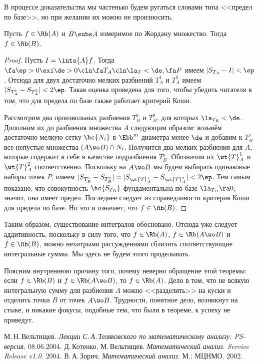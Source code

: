 \documentclass[a4paper]{article}
\begin{document}
В процессе доказательства мы частенько будем ругаться словами типа <<предел по базе>>, но при
желании их можно не произносить.

\begin{theorem}
Пусть $f \in \Rb(A)$ и $B \subs A$ измеримое по Жордану множество.
Тогда $f \in \Rb(B)$.
\end{theorem}
\begin{proof}
Пусть $I = \ints{A} f$. Тогда $\fa \ep > 0 \exi \de > 0\cln \fa T_A\cln \la_T < \de, \fa P$
имеем $|S_{T_A} - I| < \ep$. Отсюда для двух достаточно мелких разбиений $T_A^1$ и $T_A^2$
имеем $|S_{T_A^1} - S_{T_A^2}| < 2\ep$. Такая оценка проведена для того, чтобы убедить читателя
в том, что для предела по базе также работает критерий Коши.

Рассмотрим два произвольных разбиения $T_B^1$ и $T_B^2$, для которых $\la_{T_B} <\de$. Дополним их
до разбиения множества $A$ следующим образом: возьмём достаточно мелкую сетку $\hc{N_i}$ в $\Ebb^m$
диаметра менее $\de$ и добавим к $T_B^j$ все непустые множества $(A \wo B) \cap N_i$. Получится два
мелких разбиения для $A$, которые содержит в себе в качестве подразбиения $T_B^j$. Обозначим их $\wt{T}^1_A$
и $\wt{T}_A^2$ соответственно. Поскольку на $A \wo B$ мы будем выбирать одинаковые наборы точек $P$,
имеем $|S_{T_B^1} - S_{T_B^2}| = |S_{\wt{T}_A^1} - S_{\wt{T}_A^2}| < 2\ep$. Тем самым показано,
что совокупность $\hc{S_{T_B}}$ фундаментальна по базе $\la_{T_B} \ra 0$, значит, она имеет предел.
Последнее следует из справедливости критерия Коши для предела по базе.
Но это и означает, что $f \in \Rb(B)$.
\end{proof}

Таким образом, существование интегралов обосновано. Отсюда уже следует аддитивность,
поскольку в силу того, что $f \in \Rb(A)$, $f \in \Rb(A \wo B)$ и $f \in \Rb(B)$, можно
нехитрыми рассуждениями сблизить соответствующие интегральные суммы. Мы здесь не будем
этого проделывать.

Поясним внутреннюю причину того, почему неверно обращение этой теоремы: если $f \in \Rb(B)$ и $f \in \Rb(A \wo B)$,
то $f \in \Rb(A)$. Дело в том, что не всякую интегральную сумму для разбиения $A$ можно <<разделить>>
на куски и отделить точки $B$ от точек $A \wo B$. Трудности, понятное дело,
возникнут на стыке, и никакие фокусы, подобные тем, что были в теореме, к успеху не приведут.


\begin{thebibliography}{[1]}
 М.\,Н.\,Вельтищев. \emph{Лекции С.\,А.\,Теляковского по математическому
анализу. PS-версия.} 08.06.2004.
 Д.\,Котенко, М.\,Вельтищев. \emph{Математический анализ. Service Release v1.0.} 2004.
 В.\,А.\,Зорич. \emph{Математический анализ.} М.: МЦНМО. 2002.
\end{thebibliography}
\end{document}
